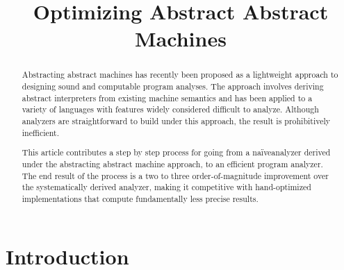 \documentclass[preprint,onecolumn,9pt]{sigplanconf} %
\newcommand{\naive}{na\"ive}
\begin{document}
\copyrightdata{[to be supplied]}


\title{Optimizing Abstract Abstract Machines}

\authorinfo{}{}{}

\maketitle

\begin{abstract}
Abstracting abstract machines has recently been proposed as a
lightweight approach to designing sound and computable program
analyses.  The approach involves deriving abstract interpreters from
existing machine semantics and has been applied to a variety of
languages with features widely considered difficult to analyze.
Although analyzers are straightforward to build under this approach,
the result is prohibitively inefficient.

This article contributes a step by step process for going from a
\naive analyzer derived under the abstracting abstract machine
approach, to an efficient program analyzer.  The end result of the
process is a two to three order-of-magnitude improvement over the
systematically derived analyzer, making it competitive with
hand-optimized implementations that compute fundamentally less precise
results.
\end{abstract}




\section{Introduction}
\end{document}
